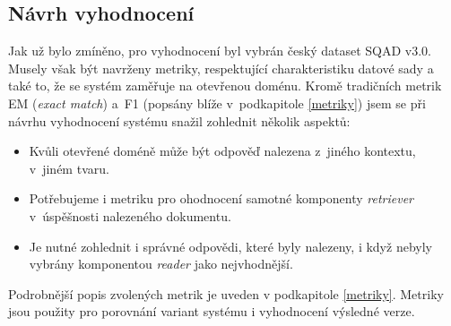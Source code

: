 \subsection{Návrh vyhodnocení}
Jak už bylo zmíněno, pro vyhodnocení byl vybrán český dataset SQAD v3.0. Musely však být navrženy metriky, respektující charakteristiku datové sady a také to, že se systém zaměřuje na otevřenou doménu. Kromě tradičních metrik EM (\emph{exact match}) a~F1 (popsány blíže v~podkapitole \ref{metriky}) jsem se při návrhu vyhodnocení systému snažil zohlednit několik aspektů:
\begin{itemize}
    \item Kvůli otevřené doméně může být odpověď nalezena z~jiného kontextu, v~jiném tvaru.
    \item Potřebujeme i metriku pro ohodnocení samotné komponenty \emph{retriever} v~úspěšnosti nalezeného dokumentu.
    \item Je nutné zohlednit i správné odpovědi, které byly nalezeny, i když nebyly vybrány komponentou \emph{reader} jako nejvhodnější.
\end{itemize}
Podrobnější popis zvolených metrik je uveden v podkapitole \ref{metriky}. Metriky jsou použity pro porovnání variant systému i vyhodnocení výsledné verze.

